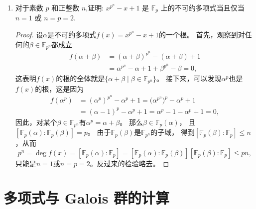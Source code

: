 \begin{enumerate}
\item 对于素数 $p$ 和正整数 $n$,证明: $x^{p^n} - x + 1$ 是 $\mathbb{F}_p$ 上的不可约多项式当且仅当 $n = 1$ 或 $n = p = 2$.
\begin{proof}
    设$\alpha$是不可约多项式$f(x)=x^{p^n}-x+1$的一个根。
    首先，观察到对任何的$\beta\in\mathbb{F}_{p^n}$都成立
    \begin{align*}
        f(\alpha+\beta)&=(\alpha+\beta)^{p^n}-(\alpha+\beta)+1\\
        &=\alpha^{p^n}-\alpha+1+\beta^{p^n}-\beta=0,
    \end{align*}
    这表明$f(x)$的根的全体就是$\{\alpha+\beta\mid\beta\in\mathbb{F}_{p^n}\}$。
    接下来，可以发现$\alpha^p$也是$f(x)$的根，这是因为
    \begin{align*}
        f(\alpha^p)&=(\alpha^p)^{p^n}-\alpha^p+1=\big(\alpha^{p^n}\big)^p-\alpha^p+1\\
        &=(\alpha-1)^p-\alpha^p+1=\alpha^p-1-\alpha^p+1=0,
    \end{align*}
    因此，对某个$\beta\in\mathbb{F}_{p^n}$有$\alpha^p=\alpha+\beta$。
    那么$\beta\in\mathbb{F}_p(\alpha)$，
    且$[\mathbb{F}_p(\alpha):\mathbb{F}_p(\beta)]=p$。
    由于$\mathbb{F}_p(\beta)$是$\mathbb{F}_{p^n}$的子域，
    得到$[\mathbb{F}_p(\beta):\mathbb{F}_p] \leqslant n$，从而
    \[p^n=\deg f(x)=[\mathbb{F}_p(\alpha):\mathbb{F}_p]
    =[\mathbb{F}_p(\alpha):\mathbb{F}_p(\beta)]
    [\mathbb{F}_p(\beta):\mathbb{F}_p]\leqslant pn,\]
    只能是$n=1$或$n=p=2$。反过来的检验略去。
\end{proof}
\end{enumerate}

\section{多项式与 Galois 群的计算}

